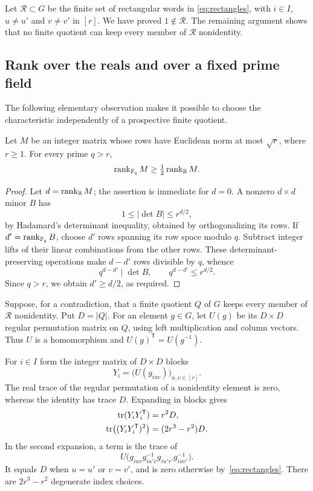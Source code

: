 Let $\mathcal R\subset G$ be the finite set of rectangular words in
\eqref{eq:rectangles}, with $i\in I$, $u\ne u'$ and $v\ne v'$ in $[r]$.
We have proved $1\notin\mathcal R$. The remaining argument shows that
no finite quotient can keep every member of $\mathcal R$ nonidentity.

\subsection{Rank over the reals and over a fixed prime field}

The following elementary observation makes it possible to choose the characteristic independently of a prospective finite quotient.

\begin{lemma}\label{lem:rank-reduction}
Let $M$ be an integer matrix whose rows have Euclidean norm at most $\sqrt r$, where $r\ge1$. For every prime $q>r$,
\[
 \operatorname{rank}_{\mathbb F_q}M\ge\tfrac12\operatorname{rank}_{\mathbb R}M.
\]
\end{lemma}

\begin{proof}
Let $d=\operatorname{rank}_{\mathbb R}M$; the assertion is immediate for $d=0$. A nonzero $d\times d$ minor $B$ has
\[
 1\le|\det B|\le r^{d/2},
\]
by Hadamard's determinant inequality, obtained by orthogonalizing its rows. If $d'=\operatorname{rank}_{\mathbb F_q}B$, choose $d'$ rows spanning its row space modulo $q$. Subtract integer lifts of their linear combinations from the other rows. These determinant-preserving operations make $d-d'$ rows divisible by $q$, whence
\[
 q^{d-d'}\mid\det B,\qquad q^{d-d'}\le r^{d/2}.
\]
Since $q>r$, we obtain $d'\ge d/2$, as required.
\end{proof}

Suppose, for a contradiction, that a finite quotient $Q$ of $G$ keeps every member of $\mathcal R$ nonidentity. Put $D=|Q|$. For an element $g\in G$, let $U(g)$ be its $D\times D$ regular permutation matrix on $Q$, using left multiplication and column vectors. Thus $U$ is a homomorphism and $U(g)^{\mathsf T}=U(g^{-1})$.

For $i\in I$ form the integer matrix of $D\times D$ blocks
\begin{equation}\label{eq:Yi}
 Y_i=\bigl(U(g_{iuv})\bigr)_{u,v\in[r]}.
\end{equation}
The real trace of the regular permutation of a nonidentity element is zero, whereas the identity has trace $D$. Expanding in blocks gives
\begin{align}
 \operatorname{tr}(Y_iY_i^{\mathsf T})&=r^2D,\label{eq:trace-first}\\
 \operatorname{tr}\bigl((Y_iY_i^{\mathsf T})^2\bigr)&=(2r^3-r^2)D.\label{eq:trace-second}
\end{align}
In the second expansion, a term is the trace of
\[
 U\bigl(g_{iuv}g_{iu'v}^{-1}g_{iu'v'}g_{iuv'}^{-1}\bigr).
\]
It equals $D$ when $u=u'$ or $v=v'$, and is zero otherwise by~\eqref{eq:rectangles}. There are $2r^3-r^2$ degenerate index choices.

